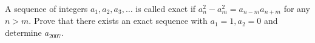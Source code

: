 A sequence of integers $a_1,a_2,a_3,\ldots$ is called exact if $a_n^2-a_m^2=a_{n-m}a_{n+m}$ for any $n>m$. Prove that there exists an exact sequence with $a_1=1,a_2=0$ and determine $a_{2007}$.